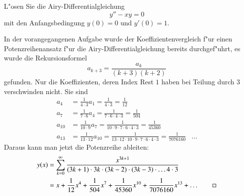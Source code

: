 L"osen Sie die Airy-Differentialgleichung
\[
y''-xy=0
\]
mit den Anfangsbedingung $y(0)=0$ und $y'(0)=1$.

\begin{loesung}
In der vorangegangenen Aufgabe wurde der Koeffizientenvergleich f"ur einen
Potenzreihenansatz f"ur die Airy-Differentialgleichung bereits durchgef"uhrt,
es wurde die Rekursionsformel
\[
a_{k+3}=\frac{a_k}{(k+3)(k+2)}
\]
gefunden.
Nur die Koeffizienten, deren Index Rest $1$ haben bei Teilung durch $3$
verschwinden nicht.
Sie sind
\begin{align*}
a_4&=\frac1{4\cdot 3}a_1=\frac1{4\cdot 3}=\frac1{12}
\\
a_7&=\frac1{7\cdot 6}a_4=\frac1{7\cdot 6\cdot 4\cdot 3}=\frac1{504}
\\
a_{10}&=\frac1{10\cdot 9}a_7
=
\frac1{10\cdot 9\cdot 7\cdot 6\cdot 4\cdot 3}=\frac1{45360}
\\
a_{13}&=\frac1{13\cdot 12}a_{10}=
\frac1{13\cdot 12\cdot 10\cdot 9\cdot 7\cdot 6\cdot 4\cdot 3}=\frac1{7076160}
&\dots
\end{align*}
Daraus kann man jetzt die Potenzreihe ableiten:
\begin{align*}
y(x)
&=
\sum_{k=0}^\infty \frac{x^{3k+1}}{(3k+1)\cdot3k\cdot (3k-2)\cdot(3k-3)\cdot \dots 4\cdot 3}
\\
&=
x + \frac1{12}x^4+\frac1{504}x^7+\frac1{45360}x^{10}+\frac1{7076160}x^{13}+\dots
\qedhere
\end{align*}
\end{loesung}

